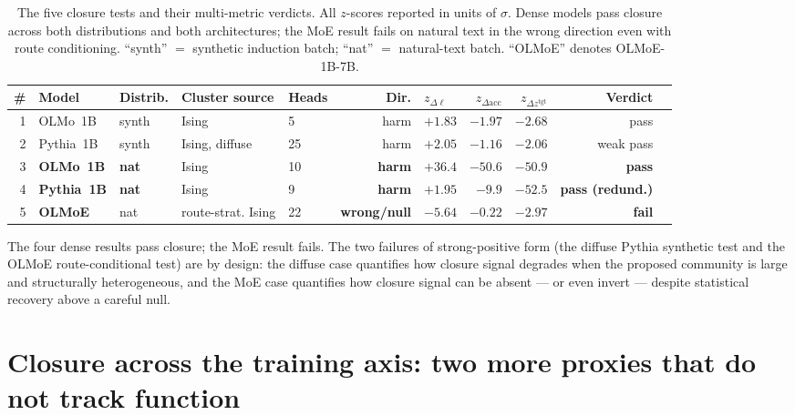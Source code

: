 \documentclass[11pt]{article}
\begin{document}
\begin{table}[h]
\centering
\footnotesize
\setlength{\tabcolsep}{4pt}
\begin{tabular}{@{}rllllrlrrrl@{}}
\toprule
\# & Model & Distrib. & Cluster source & Heads & Dir. & $z_{\Delta\ell}$ & $z_{\Delta\text{acc}}$ & $z_{\Delta z^{\text{tgt}}}$ & Verdict \\
\midrule
1 & OLMo~1B & synth & Ising & 5 & harm & $+1.83$ & $-1.97$ & $-2.68$ & pass \\
2 & Pythia~1B & synth & Ising, diffuse & 25 & harm & $+2.05$ & $-1.16$ & $-2.06$ & weak pass \\
3 & \textbf{OLMo~1B} & \textbf{nat} & Ising & 10 & \textbf{harm} & $\mathbf{+36.4}$ & $\mathbf{-50.6}$ & $\mathbf{-50.9}$ & \textbf{pass} \\
4 & \textbf{Pythia~1B} & \textbf{nat} & Ising & 9 & \textbf{harm} & $+1.95$ & $\mathbf{-9.9}$ & $\mathbf{-52.5}$ & \textbf{pass (redund.)} \\
5 & \textbf{OLMoE} & nat & route-strat. Ising & 22 & \textbf{wrong/null} & $\mathbf{-5.64}$ & $-0.22$ & $-2.97$ & \textbf{fail} \\
\bottomrule
\end{tabular}
\caption{The five closure tests and their multi-metric verdicts. All
$z$-scores reported in units of $\sigma$. Dense models pass closure across
both distributions and both architectures; the MoE result fails on
natural text in the wrong direction even with route conditioning. ``synth''
$=$ synthetic induction batch; ``nat'' $=$ natural-text batch. ``OLMoE''
denotes OLMoE-1B-7B.}
\label{tab:verdict}
\end{table}

The four dense results pass closure; the MoE result fails. The two
failures of strong-positive form (the diffuse Pythia synthetic test and
the OLMoE route-conditional test) are by design: the diffuse case
quantifies how closure signal degrades when the proposed community is
large and structurally heterogeneous, and the MoE case quantifies how
closure signal can be absent --- or even invert --- despite statistical
recovery above a careful null.

\section{Closure across the training axis: two more proxies that do not track function}
\label{sec:developmental}
\end{document}
